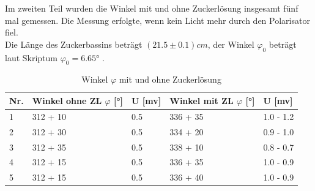 \documentclass[12pt,a4paper,twoside]{article}
\begin{document}
\noindent
Im zweiten Teil wurden die Winkel mit und ohne Zuckerlösung insgesamt fünf mal gemessen. Die Messung erfolgte, wenn kein Licht mehr durch den Polarisator fiel. 
\\
Die Länge des Zuckerbassins beträgt $(21.5 \pm 0.1)cm$, der Winkel $\varphi_0$ beträgt laut Skriptum $\varphi_0 = 6.65$° \cite{teachcenter2}. 

\begin{table}[H]
    \centering
    \caption{Winkel $\varphi$ mit und ohne Zuckerlösung}
    \label{tab:Messdaten Zuckerlösung}
    \begin{tabular}{| l | l | l | l | l |}
        \hline
        Nr. & Winkel ohne ZL $\varphi$ [°] & U [mv] & Winkel mit ZL $\varphi$ [°] & U [mv] \\
        \hline
        1   & 312 + 10  & 0.5   & 336 + 35 & 1.0 - 1.2 \\
        2   & 312 + 30  & 0.5   & 334 + 20 & 0.9 - 1.0 \\
        3   & 312 + 35  & 0.5   & 338 + 10 & 0.8 - 0.7 \\
        4   & 312 + 15  & 0.5   & 336 + 35 & 1.0 - 0.9 \\
        5   & 312 + 15  & 0.5   & 336 + 40 & 1.0 - 0.9 \\
        \hline
    \end{tabular}
\end{table}
\end{document}
